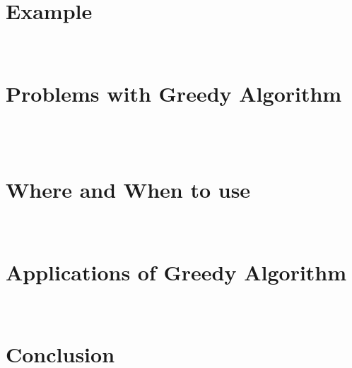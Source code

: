 \documentclass{article}
\begin{document}


~~~~~~~~\\ 

\section{ Example}



~~~~~~~~\\

\section{Problems with Greedy Algorithm}




~~~~~~~~\\ \\

\newpage
\section{Where and When to use}




~~~~~~~~\\ 

\section{ Applications of Greedy Algorithm}




~~~~~~~~\\ 

\section{Conclusion}





	
\end{document}
